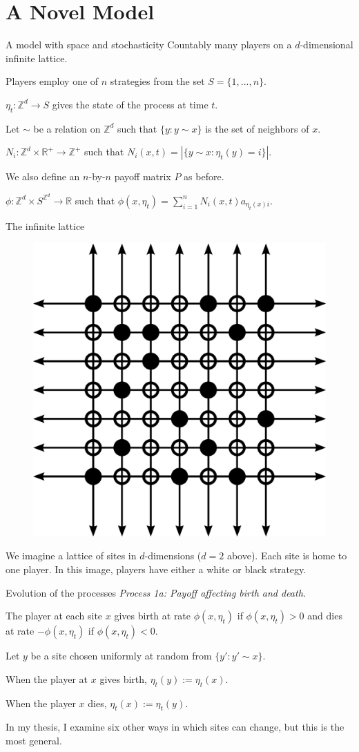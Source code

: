 \documentclass{beamer}
\begin{document}
\section{A Novel Model}
\begin{frame}[c]{A model with space and stochasticity}
Countably many players on a $d$-dimensional infinite lattice.

Players employ one of $n$ strategies from the set $S = \{1,...,n\}$. 

$\eta_t:\mathbb{Z}^d \to S$ gives the state of the process at time $t$.

Let $\sim$ be a relation on $\mathbb{Z}^d$ such that $\{y: y\sim x\}$ is the set of neighbors of $x$.

$N_i:\mathbb{Z}^d\times \mathbb{R}^+\to \mathbb{Z}^+$ such that
$N_i(x,t) = |\{y\sim x:\eta_t(y) = i\}|$.

We also define an $n$-by-$n$ payoff matrix $P$ as before.

$\phi:\mathbb{Z}^d\times S^{\mathbb{Z}^d} \to \mathbb{R}$ such that
$\phi(x,\eta_t) = \sum_{i=1}^n N_i(x,t)a_{\eta_t(x)i}$.
\end{frame}

\begin{frame}[c]{The infinite lattice}
\begin{figure}
  \includegraphics[width=.4\textwidth]{./images/infinite_lattice.eps}
\end{figure}
\begin{block}{}
  \small{We imagine a lattice of sites in $d$-dimensions ($d=2$ above). Each site is home to one player. In this image, players have either a white or black strategy.}
\end{block}
\end{frame}

\begin{frame}[c]{Evolution of the processes}
\emph{Process 1a: Payoff affecting birth and death.}

The player at each site $x$ gives birth at rate $\phi(x,\eta_t)$ if
$\phi(x,\eta_t) > 0$ and dies at rate $-\phi(x,\eta_t)$ if $\phi(x,\eta_t) <
0$. 

Let $y$ be a site chosen uniformly at random from $\{y':y'\sim
x\}$. 

When the player at $x$ gives birth, $\eta_t(y) :=
\eta_t(x)$. 

When the player $x$ dies, $\eta_t(x) := \eta_t(y)$.

\begin{block}{}
  In my thesis, I examine six other ways in which sites can change, but this is the most general.
\end{block}
\end{frame}
\end{document}
